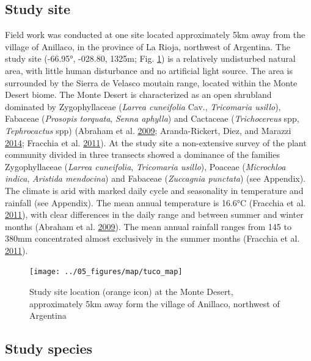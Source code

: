 \documentclass[msc,numbers,hidelinks]{coppe}
\begin{document}
  \hypertarget{study-site}{%
  \subsection{Study site}\label{study-site}}

  Field work was conducted at one site located approximately 5km away from the village of Anillaco, in the province of La Rioja, northwest of Argentina. The study site (-66.95°, -028.80, 1325m; Fig. \ref{fig:methods-map}) is a relatively undisturbed natural area, with little human disturbance and no artificial light source. The area is surrounded by the Sierra de Velasco moutain range, located within the Monte Desert biome. The Monte Desert is characterized as an open shrubland dominated by Zygophyllaceae (\emph{Larrea cuneifolia} Cav., \emph{Tricomaria usillo}), Fabaceae (\emph{Prosopis torquata}, \emph{Senna aphylla}) and Cactaceae (\emph{Trichocereus} spp, \emph{Tephrocactus} spp) (Abraham et al. \protect\hyperlink{ref-abrahamOverviewGeographyMonte2009}{2009}; Aranda-Rickert, Diez, and Marazzi \protect\hyperlink{ref-aranda-rickertExtrafloralNectarFuels2014}{2014}; Fracchia et al. \protect\hyperlink{ref-fracchiaDispersalArbuscularMycorrhizal2011}{2011}). At the study site a non-extensive survey of the plant community divided in three transects showed a dominance of the families Zygophyllaceae (\emph{Larrea cuneifolia}, \emph{Tricomaria usillo}), Poaceae (\emph{Microchloa indica}, \emph{Aristida mendocina}) and Fabaceae (\emph{Zuccagnia punctata}) (see Appendix). The climate is arid with marked daily cycle and seasonality in temperature and rainfall (see Appendix). The mean annual temperature is 16.6°C (Fracchia et al. \protect\hyperlink{ref-fracchiaDispersalArbuscularMycorrhizal2011}{2011}), with clear differences in the daily range and between summer and winter months (Abraham et al. \protect\hyperlink{ref-abrahamOverviewGeographyMonte2009}{2009}). The mean annual rainfall ranges from 145 to 380mm concentrated almost exclusively in the summer months (Fracchia et al. \protect\hyperlink{ref-fracchiaDispersalArbuscularMycorrhizal2011}{2011}).
  \begin{figure}
  \texttt{[image: ../05\_figures/map/tuco\_map]} \caption{Study site location (orange icon) at the Monte Desert, approximately 5km away form the village of Anillaco, northwest of Argentina}\label{fig:methods-map}
  \end{figure}
  \hypertarget{study-species}{%
  \subsection{Study species}\label{study-species}}
\end{document}
